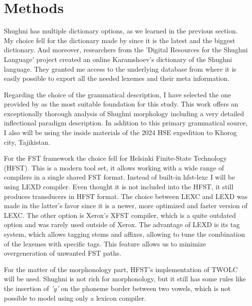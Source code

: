 \section{Methods}
\par Shughni has multiple dictionary options, as we learned in the previous section. My choice fell for the dictionary made by \textcite{karamshoev_dict_1988} since it is the latest and the biggest dictionary. And moreover, researchers from the 'Digital Resources for the Shughni Language' project \parencite{makarov_digital_2022} created an online Karamshoev's dictionary of the Shughni language. They granted me access to the underlying database from where it is easily possible to export all the needed lexemes and their meta information.
\par Regarding the choice of the grammatical description, I have selected the one provided by \textcite{parker_shughni_2023} as the most suitable foundation for this study. This work offers an exceptionally thorough analysis of Shughni morphology including a very detailed inflectional paradigm description. In addition to this primary grammatical source, I also will be using the inside materials of the 2024 HSE expedition to Khorog city, Tajikistan.
\par For the FST framework the choice fell for Helsinki Finite-State Technology (HFST). This is a modern tool set, it allows working with a wide range of compilers in a single shared FST format. Instead of built-in hfst-lexc I will be using LEXD compiler. Even thought it is not included into the HFST, it still produces transducers in HFST format. The choice between LEXC and LEXD was made in the latter's favor since it is a newer, more optimized and faster version of LEXC. The other option is Xerox's XFST compiler, which is a quite outdated option and was rarely used outside of Xerox. The advantage of LEXD is its tag system, which allows tagging stems and affixes, allowing to tune the combination of the lexemes with specific tags. This feature allows us to minimize overgeneration of unwanted FST paths.
\par For the matter of the morphonology part, HFST's implementation of TWOLC will be used. Shughni is not rich for morphonology, but it still has some rules like the insertion of \textit{'y'} on the phoneme border between two vowels, which is not possible to model using only a lexicon compiler.
